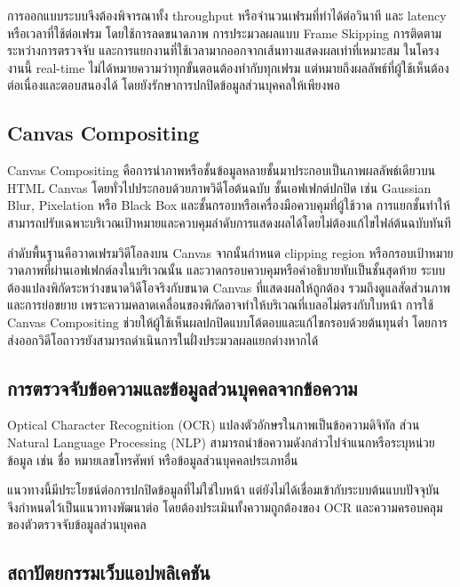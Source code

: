 การออกแบบระบบจึงต้องพิจารณาทั้ง throughput หรือจำนวนเฟรมที่ทำได้ต่อวินาที และ latency หรือเวลาที่ใช้ต่อเฟรม โดยใช้การลดขนาดภาพ การประมวลผลแบบ Frame Skipping การติดตามระหว่างการตรวจจับ และการแยกงานที่ใช้เวลามากออกจากเส้นทางแสดงผลเท่าที่เหมาะสม ในโครงงานนี้ real-time ไม่ได้หมายความว่าทุกขั้นตอนต้องทำกับทุกเฟรม แต่หมายถึงผลลัพธ์ที่ผู้ใช้เห็นต้องต่อเนื่องและตอบสนองได้ โดยยังรักษาการปกปิดข้อมูลส่วนบุคคลให้เพียงพอ

\subsection{Canvas Compositing}

Canvas Compositing คือการนำภาพหรือชั้นข้อมูลหลายชั้นมาประกอบเป็นภาพผลลัพธ์เดียวบน HTML Canvas โดยทั่วไปประกอบด้วยภาพวิดีโอต้นฉบับ ชั้นเอฟเฟกต์ปกปิด เช่น Gaussian Blur, Pixelation หรือ Black Box และชั้นกรอบหรือเครื่องมือควบคุมที่ผู้ใช้วาด การแยกชั้นทำให้สามารถปรับเฉพาะบริเวณเป้าหมายและควบคุมลำดับการแสดงผลได้โดยไม่ต้องแก้ไขไฟล์ต้นฉบับทันที \cite{mdn_canvas}

ลำดับพื้นฐานคือวาดเฟรมวิดีโอลงบน Canvas จากนั้นกำหนด clipping region หรือกรอบเป้าหมาย วาดภาพที่ผ่านเอฟเฟกต์ลงในบริเวณนั้น และวาดกรอบควบคุมหรือคำอธิบายทับเป็นชั้นสุดท้าย ระบบต้องแปลงพิกัดระหว่างขนาดวิดีโอจริงกับขนาด Canvas ที่แสดงผลให้ถูกต้อง รวมถึงดูแลสัดส่วนภาพและการย่อขยาย เพราะความคลาดเคลื่อนของพิกัดอาจทำให้บริเวณที่เบลอไม่ตรงกับใบหน้า การใช้ Canvas Compositing ช่วยให้ผู้ใช้เห็นผลปกปิดแบบโต้ตอบและแก้ไขกรอบด้วยต้นทุนต่ำ โดยการส่งออกวิดีโอถาวรยังสามารถดำเนินการในฝั่งประมวลผลแยกต่างหากได้

\subsection{การตรวจจับข้อความและข้อมูลส่วนบุคคลจากข้อความ}

Optical Character Recognition (OCR) แปลงตัวอักษรในภาพเป็นข้อความดิจิทัล ส่วน Natural Language Processing (NLP) สามารถนำข้อความดังกล่าวไปจำแนกหรือระบุหน่วยข้อมูล เช่น ชื่อ หมายเลขโทรศัพท์ หรือข้อมูลส่วนบุคคลประเภทอื่น \cite{pii_label}

แนวทางนี้มีประโยชน์ต่อการปกปิดข้อมูลที่ไม่ใช่ใบหน้า แต่ยังไม่ได้เชื่อมเข้ากับระบบต้นแบบปัจจุบัน จึงกำหนดไว้เป็นแนวทางพัฒนาต่อ โดยต้องประเมินทั้งความถูกต้องของ OCR และความครอบคลุมของตัวตรวจจับข้อมูลส่วนบุคคล

\subsection{สถาปัตยกรรมเว็บแอปพลิเคชัน}

